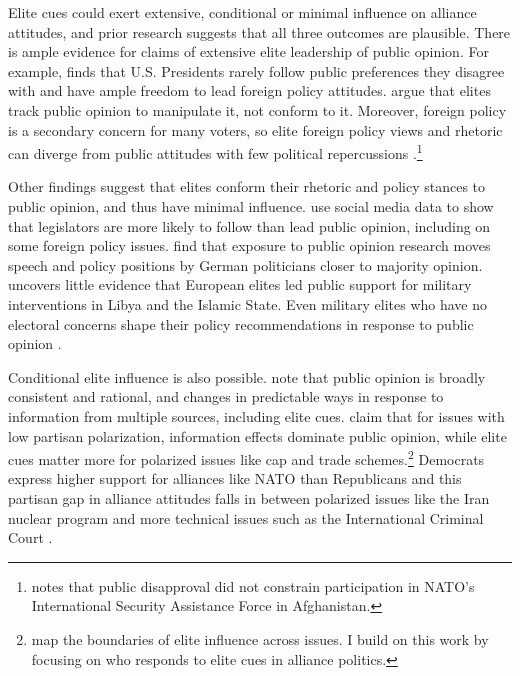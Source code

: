 \documentclass[12pt]{article}
\begin{document}
Elite cues could exert extensive, conditional or minimal influence on alliance attitudes, and prior research suggests that all three outcomes are plausible. 
There is ample evidence for claims of extensive elite leadership of public opinion. 
For example, \citet{Canes-Wrone2006} finds that U.S. Presidents rarely follow public preferences they disagree with and have ample freedom to lead foreign policy attitudes. 
\citet{JacobsShapiro2000} argue that elites track public opinion to manipulate it, not conform to it.
Moreover, foreign policy is a secondary concern for many voters, so elite foreign policy views and rhetoric can diverge from public attitudes with few political repercussions \citep{BusbyMonten2012}.\footnote{\citet{Kreps2010} notes that public disapproval did not constrain participation in NATO's International Security Assistance Force in Afghanistan.}


Other findings suggest that elites conform their rhetoric and policy stances to public opinion, and thus have minimal influence. 
\citet{Barberaetal2019} use social media data to show that legislators are more likely to follow than lead public opinion, including on some foreign policy issues. 
\citet{HagerHilbig2020} find that exposure to public opinion research moves speech and policy positions by German politicians closer to majority opinion. 
\citet{Haesebrouck2019} uncovers little evidence that European elites led public support for military interventions in Libya and the Islamic State. 
Even military elites who have no electoral concerns shape their policy recommendations in response to public opinion \citep{LinGreenberg2021}. 


Conditional elite influence is also possible. 
\citet{PageShapiro1992} note that public opinion is broadly consistent and rational, and changes in predictable ways in response to information from multiple sources, including elite cues. 
\citet{GuisingerSaunders2017} claim that for issues with low partisan polarization, information effects dominate public opinion, while elite cues matter more for polarized issues like cap and trade schemes.\footnote{\citet{GuisingerSaunders2017} map the boundaries of elite influence across issues. I build on this work by focusing on who responds to elite cues in alliance politics.}
Democrats express higher support for alliances like NATO than Republicans \citep{PewNATO2020} and this partisan gap in alliance attitudes falls in between polarized issues like the Iran nuclear program and more technical issues such as the International Criminal Court \citet{GuisingerSaunders2017}. 
\end{document}
